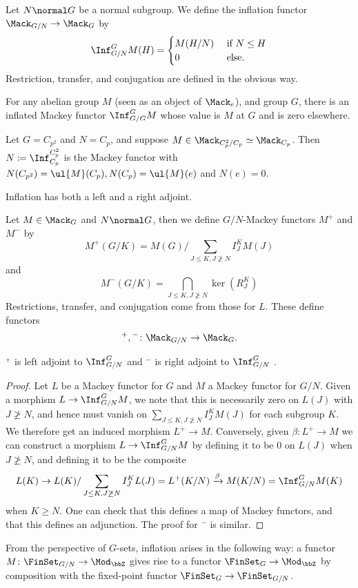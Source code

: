 \documentclass{willowtreebook}
\begin{document}
\begin{definition}
    Let $N \normal G$ be a normal subgroup. We define the inflation functor $\Mack_{G/N} \to \Mack_G$ by
    \[
    \Inf_{G/N}^GM(H) = \begin{cases}
        M(H/N) & \text{ if } N \le H \\
        0 & \text{ else}. 
    \end{cases}
    \]
    Restriction, transfer, and conjugation are defined in the obvious way. 
\end{definition}
\begin{example}
    For any abelian group $M$ (seen as an object of $\Mack_e$), and group $G$, there is an inflated Mackey functor $\Inf_{G/G}^GM$ whose value is $M$ at $G$ and is zero elsewhere. 
\end{example}
\begin{example}
    Let $G = C_{p^2}$ and $N = C_p$, and suppose $M \in \Mack_{C_p^2/C_p} \simeq \Mack_{C_p}$. Then $N \coloneqq \Inf_{C_p}^{C_p^2}$ is the Mackey functor with $N(C_{p^2}) = \ul{M}(C_p),N(C_p) = \ul{M}(e)$ and $N(e) = 0$. 
\end{example}
Inflation has both a left and a right adjoint. 
\begin{definition}
    Let $M \in \Mack_G$ and $N \normal G$, then we define $G/N$-Mackey functors $M^+$ and $M^-$ by
    \[
    M^+(G/K) = M(G)/\sum_{J \le K, J \not \ge N} I^K_J M(J)
    \]
    and
    \[
    M^-(G/K) = \bigcap_{J \le K, J \not \ge N} \ker(R^K_J)
    \]
    Restrictions, transfer, and conjugation come from those for $L$. These define functors
    \[
    {}^+,{}^- \colon \Mack_{G/N} \to \Mack_G.
    \]
\end{definition}
\begin{proposition}
    ${}^+$ is left adjoint to $\Inf_{G/N}^G$ and ${}^-$ is right adjoint to $\Inf_{G/N}^G$ . 
\end{proposition}
\begin{proof}
    Let $L$ be a Mackey functor for $G$ and $M$ a Mackey functor for $G/N$. Given a morphism $L \to \Inf_{G/N}^GM$, we note that this is necessarily zero on $L(J)$ with $J \not \ge N$, and hence must vanish on $\sum_{J \le K, J \not \ge N} I^K_J M(J)$ for each subgroup $K$. We therefore get an induced morphism $L^+ \to M$. Conversely, given $\beta \colon L^+ \to M$ we can construct a morphism $L \to \Inf_{G/N}^GM$ by defining it to be 0 on $L(J)$ when $J \not \ge N$, and defining it to be the composite
    \[
    L(K) \to L(K)/\sum_{J \le K, J \not \ge N} I^K_J L(J) = L^+(K/N) \xrightarrow{\beta} M(K/N) = \Inf_{G/N}^G M(K)
    \]
    when $K \ge N$. One can check that this defines a map of Mackey functors, and that this defines an adjunction. The proof for ${}^-$ is similar. 
\end{proof}
\begin{remark}
    From the perspective of $G$-sets, inflation arises in the following way: a functor $M \colon \FinSet_{G/N} \to \Mod_{\bbZ}$ gives rise to a functor $\FinSet_G \to \Mod_{\bbZ}$ by composition with the fixed-point functor $\FinSet_G \to \FinSet_{G/N}$.
\end{remark}
\par\bigskip\noindent
\end{document}
